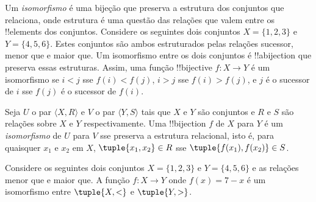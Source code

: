 \documentclass[../../../include/open-logic-section]{subfiles}
\begin{document}

\begin{explain}
Um \emph{isomorfismo} é uma bijeção que preserva a estrutura dos
conjuntos que relaciona, onde estrutura é uma questão das relações
que valem entre os !!{element}s dos conjuntos. Considere os
seguintes dois conjuntos $X=\{1,2,3\}$ e $Y=\{4,5,6\}$. Estes conjuntos são
ambos estruturados pelas relações sucessor, menor que e maior
que. Um isomorfismo entre os dois conjuntos é !!a{bijection} que
preserva essas estruturas. Assim, uma função !!{bijective} $f \colon X
\to Y$ é um isomorfismo se $i<j$ sse $f(i)<f(j)$, $i>j$ sse
$f(i)>f(j)$, e $j$ é o sucessor de $i$ sse $f(j)$ é o
sucessor de $f(i)$.
\end{explain}

\begin{defn}[Isomorfismo]
Seja $U$ o par $\langle X, R\rangle$ e $V$ o par $\langle
Y, S\rangle$ tais que $X$ e $Y$ são conjuntos e $R$ e $S$ são
relações sobre $X$ e $Y$ respectivamente. Uma !!{bijection} $f$ de $X$ para
$Y$ é um \emph{isomorfismo} de $U$ para $V$ sse preserva a
estrutura relacional, isto é, para quaisquer $x_{1}$ e $x_{2}$ em $X$,
$\tuple{x_1,x_2} \in R$ sse $\tuple{f(x_1),f(x_2)} \in S$.
\end{defn}

\begin{ex}
Considere os seguintes dois conjuntos $X=\{1,2,3\}$ e $Y=\{4,5,6\}$ e
as relações menor que e maior que. A função $f\colon X \to
Y$ onde $f(x) = 7-x$ é um isomorfismo entre $\tuple{X,<}$ e
$\tuple{Y,>}$.
\end{ex}
\end{document}
